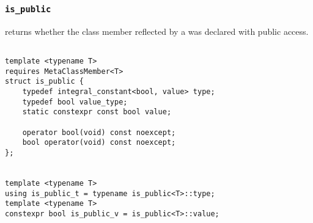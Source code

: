 
\subsubsection{\texttt{is\_public}}

returns whether the class member reflected by a  was declared with public access.

\begin{verbatim}

template <typename T>
requires MetaClassMember<T>
struct is_public {
	typedef integral_constant<bool, value> type;
	typedef bool value_type;
	static constexpr const bool value;

	operator bool(void) const noexcept;
	bool operator(void) const noexcept;
};


template <typename T>
using is_public_t = typename is_public<T>::type;
template <typename T>
constexpr bool is_public_v = is_public<T>::value;

\end{verbatim}
